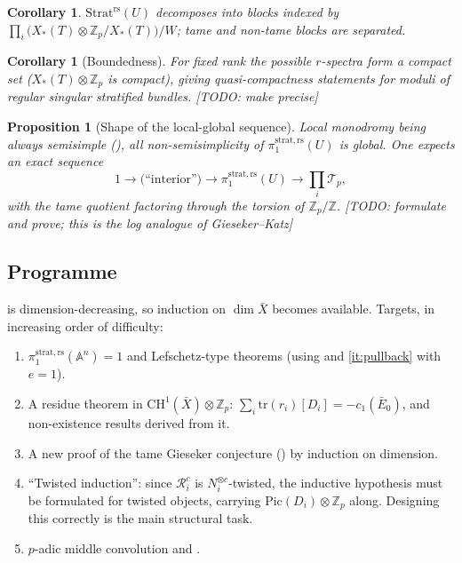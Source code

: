 \documentclass[11pt,reqno]{amsart}
\newcommand{\TODO}[1]{{\color{red}\textsf{[TODO: #1]}}}
\newcommand{\Zp}{\mathbb{Z}_p}
\newcommand{\ZZ}{\mathbb{Z}}
\newcommand{\AAA}{\mathbb{A}}
\newcommand{\cR}{\mathcal{R}}
\newcommand{\cT}{\mathcal{T}}
\newcommand{\Strat}{\mathrm{Strat}}
\newcommand{\rs}{\mathrm{rs}}
\newcommand{\strat}{\mathrm{strat}}
\newcommand{\Pic}{\mathrm{Pic}}
\newcommand{\tr}{\mathrm{tr}}
\newcommand{\Xst}{X_*(T)}
\theoremstyle{plain}
\newtheorem{proposition}[theorem]{Proposition}
\newtheorem{corollary}[theorem]{Corollary}
\theoremstyle{definition}
\theoremstyle{remark}
\numberwithin{equation}{section}
\begin{document}
\begin{corollary}\label{cor:blocks}
$\Strat^{\rs}(U)$ decomposes into blocks indexed by
$\prod_i\bigl(\Xst\otimes\Zp/\Xst\bigr)/W$; tame and non-tame blocks are
separated.
\end{corollary}

\begin{corollary}[Boundedness]
For fixed rank the possible $r$-spectra form a compact set
($\Xst\otimes\Zp$ is compact), giving quasi-compactness statements for
moduli of regular singular stratified bundles.
\TODO{make precise}
\end{corollary}

\begin{proposition}[Shape of the local-global sequence]
Local monodromy being always semisimple (), all
non-semisimplicity of $\pi_1^{\strat,\rs}(U)$ is global.  One expects an
exact sequence
\[
   1\to \bigl(\text{``interior''}\bigr)\to
   \pi_1^{\strat,\rs}(U)\to\prod_i\cT_p ,
\]
with the tame quotient factoring through the torsion of $\Zp/\ZZ$.
\TODO{formulate and prove; this is the log analogue of Gieseker--Katz}
\end{proposition}

\subsection{Programme}
 is dimension-decreasing, so induction on
$\dim\bar X$ becomes available.  Targets, in increasing order of
difficulty:
\begin{enumerate}
\item $\pi_1^{\strat,\rs}(\AAA^n)=1$ and Lefschetz-type theorems (using
       and \eqref{it:pullback}
      with $e=1$).
\item A residue theorem in $\mathrm{CH}^1(\bar X)\otimes\Zp$:
      $\sum_i\tr(r_i)[D_i]=-c_1(\bar E_0)$, and non-existence results
      derived from it.
\item A new proof of the tame Gieseker conjecture
      (\cite{EsnaultKindler}) by induction on dimension.
\item ``Twisted induction'': since $\cR_i^c$ is $N_i^{\otimes c}$-twisted,
      the inductive hypothesis must be formulated for twisted objects,
      carrying $\Pic(D_i)\otimes\Zp$ along.  Designing this correctly is
      the main structural task.
\item $p$-adic middle convolution and .
\end{enumerate}
\end{document}
